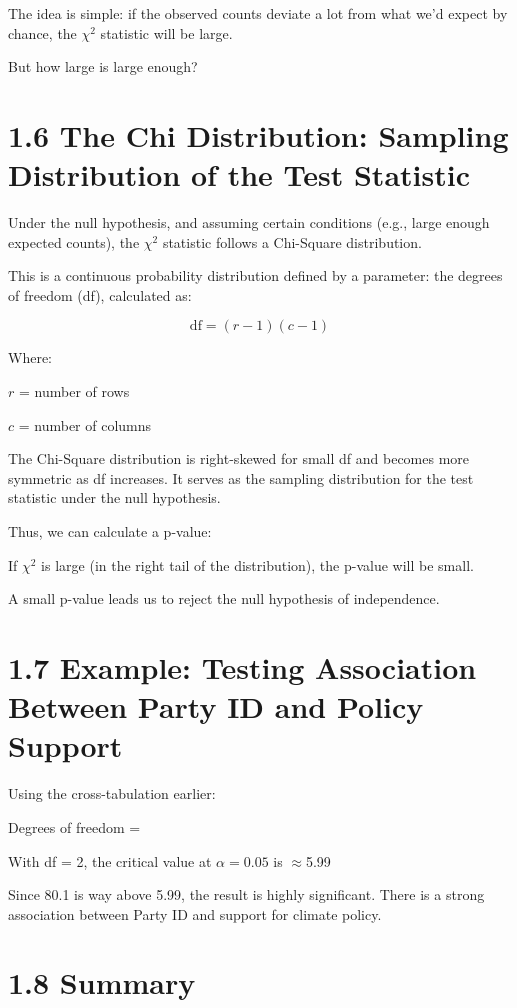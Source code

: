 \documentclass[12pt]{article}
\begin{document}
The idea is simple: if the observed counts deviate a lot from what we’d expect by chance, the \(\chi^2\) statistic will be large.

But how large is large enough?

\section*{1.6 The Chi Distribution: Sampling Distribution of the Test Statistic}

Under the null hypothesis, and assuming certain conditions (e.g., large enough expected counts), the \(\chi^2\) statistic follows a Chi-Square distribution.

This is a continuous probability distribution defined by a parameter: the degrees of freedom (df), calculated as:

\[
\text{df} = (r - 1)(c - 1)
\]

Where:

\(r\) = number of rows

\(c\) = number of columns

The Chi-Square distribution is right-skewed for small df and becomes more symmetric as df increases. It serves as the sampling distribution for the test statistic under the null hypothesis.

Thus, we can calculate a p-value:

If \(\chi^2\) is large (in the right tail of the distribution), the p-value will be small.

A small p-value leads us to reject the null hypothesis of independence.

\section*{1.7 Example: Testing Association Between Party ID and Policy Support}

Using the cross-tabulation earlier:

Degrees of freedom =

With df = 2, the critical value at \(\alpha = 0.05\) is $\approx$5.99

Since 80.1 is way above 5.99, the result is highly significant. There is a strong association between Party ID and support for climate policy.

\section*{1.8 Summary}
\end{document}
